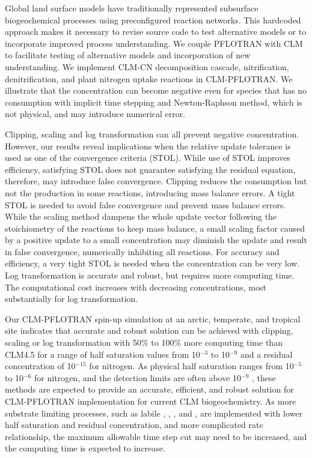 \documentclass[gmd, manuscript]{copernicus}
\begin{document}
%
Global land surface models have traditionally represented subsurface biogeochemical processes using preconfigured reaction networks. This hardcoded approach makes it necessary to revise source code to test alternative models or to incorporate improved process understanding. We couple PFLOTRAN with CLM to facilitate testing of alternative models and incorporation of new understanding. We implement CLM-CN decomposition cascade, nitrification, denitrification, and plant nitrogen uptake reactions in CLM-PFLOTRAN. We illustrate that the concentration can become negative even for species that has no consumption with implicit time stepping and Newton-Raphson method, which is not physical, and may introduce numerical error. 

Clipping, scaling  and log transformation can all prevent
negative concentration. However, our results reveal implications when the relative update tolerance is used as one of the convergence criteria (STOL). 
While use of STOL improves efficiency, satisfying STOL does not guarantee satisfying the residual equation, therefore, may introduce false convergence.
Clipping reduces the consumption but not the production in some reactions, introducing mass balance errors. A tight STOL is needed to avoid false convergence and prevent mass balance errors. While the scaling method dampens the whole update vector following the stoichiometry of the reactions to keep mass balance, a small scaling factor caused by a positive update to a small concentration may diminish the update and result in false convergence, numerically inhibiting all reactions. For accuracy and efficiency, a very tight STOL is needed when the concentration can be very low.
Log transformation is accurate and robust, but requires more computing time. The computational cost increases with decreasing concentrations, most substantially for log transformation.

Our CLM-PFLOTRAN spin-up simulation at an arctic, temperate, and tropical site
indicates that accurate and robust solution can be achieved with clipping, scaling or log
transformation with 50\% to 100\% more computing time than CLM4.5 for a range of half
saturation values from 10$^{-3}$ to 10$^{-9}$ and a residual concentration of
10$^{-15}$ for nitrogen. As physical half
saturation ranges from 10$^{-5}$ to 10$^{-6}$  for nitrogen, and the
detection limits are often above 10$^{-9}$ , these methods are expected to provide an accurate, efficient, and robust solution
for CLM-PFLOTRAN implementation for current CLM biogeochemistry. As more
substrate limiting processes, such as labile , , ,
and , are implemented with lower half saturation and residual
concentration, and more complicated rate relationship, the maximum allowable
time step cut may need to be increased, and the computing time is expected to
increase.
\end{document}
